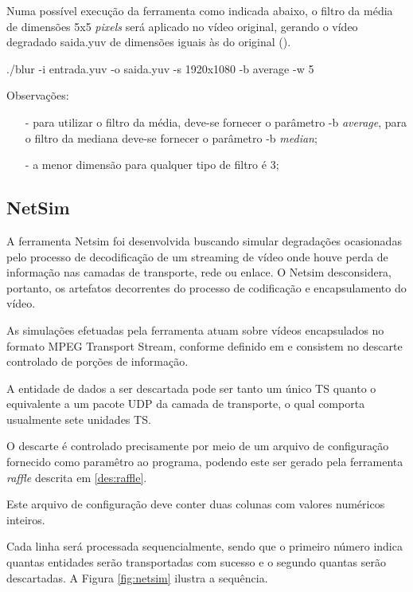 Numa possível execução da ferramenta como indicada abaixo, o filtro da média de dimensões 5x5 \emph{pixels} será aplicado no vídeo original, gerando o vídeo degradado saida.yuv de dimensões iguais às do original ().

./blur -i entrada.yuv -o saida.yuv -s 1920x1080 -b average -w 5

Observações:
\begin{itemize}
    \item[-] para utilizar o filtro da média, deve-se fornecer o parâmetro -b \emph{average}, para o filtro da mediana deve-se fornecer o parâmetro -b \emph{median};
    \item[-] a menor dimensão para qualquer tipo de filtro é 3;
\end{itemize}

\subsection{NetSim}

A ferramenta Netsim foi desenvolvida buscando simular degradações ocasionadas pelo processo de decodificação de um streaming de vídeo onde houve perda de informação nas camadas de transporte, rede ou enlace. O Netsim desconsidera, portanto, os artefatos decorrentes do processo de codificação e encapsulamento do vídeo.

As simulações efetuadas pela ferramenta atuam sobre vídeos encapsulados no formato MPEG Transport Stream, conforme definido em \cite{ituh222} e consistem no descarte controlado de porções de informação.

A entidade de dados a ser descartada pode ser tanto um único TS quanto o equivalente a um pacote UDP da camada de transporte, o qual comporta usualmente sete unidades TS.

O descarte é controlado precisamente por meio de um arquivo de configuração fornecido como paramêtro ao programa, podendo este ser gerado pela ferramenta \emph{raffle} descrita em \ref{des:raffle}.

Este arquivo de configuração deve conter duas colunas com valores numéricos inteiros. 

Cada linha será processada sequencialmente, sendo que o primeiro número indica quantas entidades serão transportadas com sucesso e o segundo quantas serão descartadas. 
A Figura \ref{fig:netsim} ilustra a sequência.

